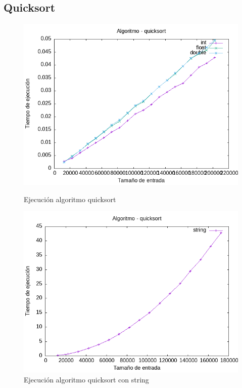 \documentclass[11pt]{article}
\begin{document}
\subsection*{Quicksort}
\begin{figure}[H]
    \begin{minipage}{0.5\textwidth}
        \centering
        \includegraphics[width=\linewidth]{assets/Img/quicksort.png}
        \caption{Ejecución algoritmo quicksort}
        \label{fig:quicksort}
    \end{minipage}%
    \begin{minipage}{0.5\textwidth}
        \centering
        \includegraphics[width=\linewidth]{assets/Img/quicksortstring.png}
        \caption{Ejecución algoritmo quicksort con string}
        \label{fig:quicksortstring}
    \end{minipage}
\end{figure}
\end{document}
